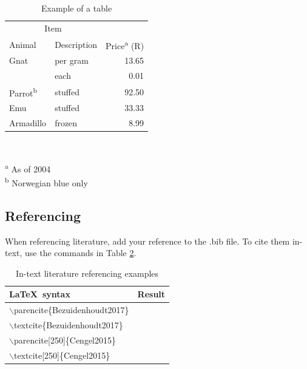 \documentclass[a4paper,12pt]{article}
\begin{document}
\begin{table}[htbp]
  \centering
  \caption{Example of a table}
  \label{tab:tabexample}
  \begin{minipage}{0.5\textwidth}
    \begin{centering}
      \begin{tabular}{@{}llr@{}} \toprule 
        \multicolumn{2}{c}{Item}                                               \\ 
        \cmidrule(r){1-2} 
        Animal                    & Description & Price\textsuperscript{a} (R) \\ 
        \midrule 
        Gnat                      & per gram    & \num{13.65}                  \\ 
                                  & each        & \num{0.01}                   \\ 
        Parrot\textsuperscript{b} & stuffed     & \num{92.50}                  \\ 
        Emu                       & stuffed     & \num{33.33}                  \\ 
        Armadillo                 & frozen      & \num{8.99}                   \\ 
        \bottomrule 
      \end{tabular}                                                            \\
    \end{centering} 
    \vspace{1em}
    \textsuperscript{a} As of 2004                                             \\
    \textsuperscript{b} Norwegian blue only
  \end{minipage}
\end{table}

\subsection{Referencing}


When referencing literature, add your reference to the .bib file. To cite them in-text, use the commands in Table \ref{tab:Cite}.

\begin{table}[!ht]
\centering
\caption{In-text literature referencing examples}
\label{tab:Cite}
    \begin{tabular}{ll}
        \toprule
        \LaTeX\ syntax & Result\\
        \midrule
        $\backslash$parencite\{Bezuidenhoudt2017\} &\parencite{Bezuidenhoudt2017} \\
        $\backslash$textcite\{Bezuidenhoudt2017\} & \textcite{Bezuidenhoudt2017} \\
        $\backslash$parencite[250]\{Cengel2015\} &\parencite[250]{Cengel2015} \\
        $\backslash$textcite[250]\{Cengel2015\} & \textcite[250]{Cengel2015} \\
        \bottomrule
    \end{tabular}
\end{table}
\end{document}
